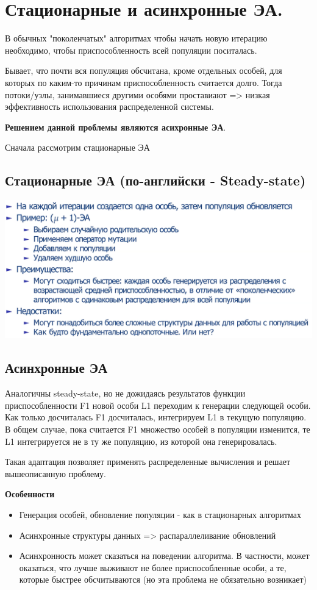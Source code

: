 \section{Стационарные и асинхронные ЭА.}

В обычных "поколенчатых" алгоритмах чтобы начать новую итерацию необходимо, чтобы приспособленность всей популяции поситалась. 

Бывает, что почти вся популяция обсчитана, кроме отдельных особей, для которых по каким-то причинам приспособленность считается долго. Тогда потоки/узлы, занимавшиеся другими особями проставиают => низкая эффективность использования распределенной системы.

\textbf{Решением данной проблемы являются асихронные ЭА}.

Сначала рассмотрим стационарные ЭА

\subsection*{Стационарные ЭА (по-английски - Steady-state)}
\includegraphics[width = 15cm]{images/68_steady_state.png}
\subsection*{Асинхронные ЭА}
Аналогичны steady-state, но не дожидаясь результатов функции приспособленности F1 новой особи L1 переходим к генерации следующей особи. Как только досчиталась F1 досчиталась, интегрируем L1 в текущую популяцию. В общем случае, пока считается F1 множество особей в популяции изменится, те L1 интегрируется не в ту же популяцию, из которой она генерировалась.

Такая адаптация позволяет применять распределенные вычисления и решает вышеописанную проблему.

\textbf{Особенности}
\begin{itemize}
    \item Генерация особей, обновление популяции - как в стационарных алгоритмах
    \item Асинхронные структуры данных => распараллеливание обновлений
    \item Асинхронность может сказаться на поведении алгоритма. В частности, может оказаться, что лучше выживают не более приспособленные особи, а те, которые быстрее обсчитываются (но эта проблема не обязательно возникает)
\end{itemize}

